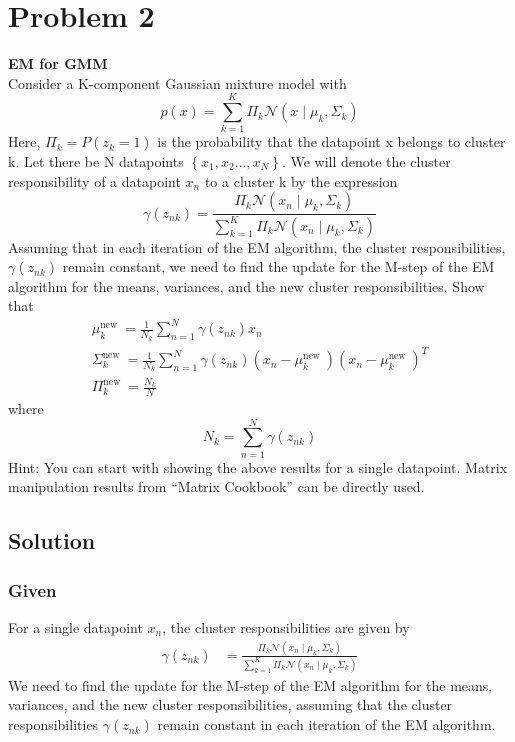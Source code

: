 \section*{Problem 2}

\textbf{EM for GMM}\\
Consider a K-component Gaussian mixture model with
\[
    p(x)=\sum_{k=1}^{K} \Pi_{k} \mathcal{N}\left(x \mid \mu_{k}, \Sigma_{k}\right)
\]
Here, \( \Pi_{k}=P\left(z_{k}=1\right) \) is the probability that the datapoint x belongs to cluster k.
Let there be N datapoints \( \left \{ x_{1}, x_{2} \ldots, x_{N}\right \} \).
We will denote the cluster responsibility of a datapoint \( x_{n} \) to a cluster k by the expression
\[
    \gamma\left(z_{n k}\right)=\frac{\Pi_{k} \mathcal{N}\left(x_{n} \mid \mu_{k}, \Sigma_{k}\right)}{\sum_{k=1}^{K} \Pi_{k} \mathcal{N}\left(x_{n} \mid \mu_{k}, \Sigma_{k}\right)}
\]
Assuming that in each iteration of the EM algorithm, the cluster responsibilities, \( \gamma\left(z_{n k}\right) \) remain constant, we need to find the update for the M-step of the EM algorithm for the means, variances, and the new cluster responsibilities.
Show that
\[
    \begin{gathered}
        \mu_{k}^{\text {new }}=\frac{1}{N_{k}} \sum_{n=1}^{N} \gamma\left(z_{n k}\right) x_{n} \\
        \Sigma_{k}^{\text {new }}=\frac{1}{N_{k}} \sum_{n=1}^{N} \gamma\left(z_{n k}\right)\left(x_{n}-\mu_{k}^{\text {new }}\right)\left(x_{n}-\mu_{k}^{\text {new }}\right)^{T} \\
        \Pi_{k}^{\text {new }}=\frac{N_{k}}{N}
    \end{gathered}
\]
where
\[
    N_{k}=\sum_{n=1}^{N} \gamma\left(z_{n k}\right)
\]
Hint: You can start with showing the above results for a single datapoint.
Matrix manipulation results from ``Matrix Cookbook'' can be directly used.

\subsection*{Solution}

\subsubsection*{Given}

For a single datapoint \( x_n \), the cluster responsibilities are given by
\begin{align*}
    \gamma\left(z_{n k}\right)
     & =
    \frac{\Pi_{k} \mathcal{N}\left(x_{n} \mid \mu_{k}, \Sigma_{k}\right)}{\sum_{k=1}^{K} \Pi_{k} \mathcal{N}\left(x_{n} \mid \mu_{k}, \Sigma_{k}\right)}
\end{align*}
We need to find the update for the M-step of the EM algorithm for the means, variances, and the new cluster responsibilities, assuming that the cluster responsibilities \( \gamma\left(z_{n k}\right) \) remain constant in each iteration of the EM algorithm.

